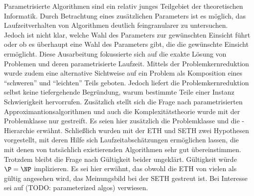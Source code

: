 \documentclass[a4paper,ngerman]{atseminar}
\begin{document}
Parametrisierte Algorithmen sind ein relativ junges Teilgebiet der theoretischen Informatik. Durch Betrachtung eines zusätzlichen
Parameters ist es möglich, das Laufzeitverhalten von Algorithmen deutlich feingranularer zu untersuchen. Jedoch ist nicht klar,
welche Wahl des Parameters zur gewünschten Einsicht führt oder ob es überhaupt eine Wahl des Parameters gibt, die die gewünschte Einsicht ermöglicht.
Diese Ausarbeitung fokussierte sich auf die exakte Lösung von Problemen und deren parametrisierte Laufzeit. Mittels der
Problemkernreduktion wurde zudem eine alternative Sichtweise auf ein Problem als Komposition eines \enquote{schweren} und \enquote{leichten} Teils
geboten. Jedoch liefert die Problemkernreduktion selbst keine tiefergehende Begründung, warum bestimmte Teile einer Instanz Schwierigkeit hervorrufen.
Zusätzlich stellt sich die Frage nach parametrisierten Approximantionsalgorithmen und auch die Komplexitätstheorie wurde mit der
Problemklasse \FPT\xspace nur gestreift. Es seien hier zusätzlich die Problemklasse \XP\xspace und die \W-Hierarchie erwähnt.
\noindent
Schließlich wurden mit der ETH und SETH zwei Hypothesen vorgestellt, mit deren Hilfe sich Laufzeitabschätzungen ermöglichen
lassen, die mit denen von tatsächlich existierenden Algorithmen sehr gut übereinstimmen. Trotzdem bleibt die Frage nach Gültigkeit beider ungeklärt. Gültigkeit würde $\P = \NP$ implizieren. Es sei hier
erwähnt, das obwohl die ETH von vielen als gültig angesehen wird, das Meinungsbild bei der SETH gestreut ist. Bei Interesse sei auf (TODO: parameterized algos) verwiesen.




\nocite{*}




\end{document}

